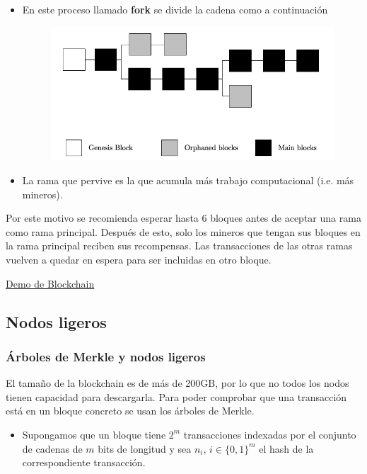\documentclass{beamer}
\theoremstyle{definition}
\begin{document}
\begin{frame}
	\begin{itemize}
		\item<1->  En este proceso llamado \textbf{fork} se divide la cadena como a continuación
		\begin{figure}
			\includegraphics[scale=0.4]{fork}
		\end{figure}
	\item<2-> La rama que pervive es la que acumula más trabajo computacional (i.e. más mineros).
	\end{itemize}
\end{frame}

\begin{frame}
	Por este motivo se recomienda esperar hasta 6 bloques antes de aceptar una rama como rama principal. Después de esto, solo los mineros que tengan sus bloques en la rama principal reciben sus recompensas. Las transacciones de las otras ramas vuelven a quedar en espera para ser incluidas en otro bloque.
\end{frame}

\begin{frame}
	\href{https://anders.com/blockchain/}{Demo de Blockchain}
\end{frame}
\subsection{Nodos ligeros}
\begin{frame}
	\frametitle{Árboles de Merkle y nodos ligeros}
	El tamaño de la blockchain es de más de 200GB, por lo que no todos los nodos tienen capacidad para descargarla. Para poder comprobar que una transacción está en un bloque concreto se usan los árboles de Merkle.
	
	\begin{itemize}
		\item<2-> Supongamos que un bloque tiene $2^m$ transacciones indexadas por el conjunto de cadenas de $m$ bits de longitud y sea $n_i$, $i\in\{0,1\}^m$ el hash de la correspondiente transacción.
	\end{itemize}
\end{frame}
\end{document}
